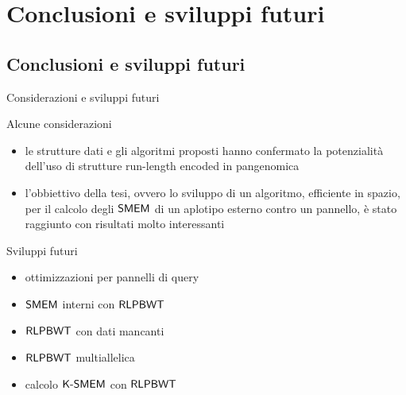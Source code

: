 \documentclass[]{beamer}
\def\KSMEM{\mbox{\rm {\sf K-SMEM}}}
\def\RLPBWT{\mbox{\rm {\sf RLPBWT}}}
\def\SMEM{\mbox{\rm {\sf SMEM}}}
\begin{document}
\section{Conclusioni e sviluppi futuri}
\subsection{Conclusioni e sviluppi futuri}
\begin{frame}{Considerazioni e sviluppi futuri}
  \begin{block}{Alcune considerazioni}
    \small
    \begin{itemize}
      \item le strutture dati e gli algoritmi proposti hanno
      confermato la potenzialità dell'uso di strutture run-length encoded in
      pangenomica
      \item l'obbiettivo della tesi, ovvero lo sviluppo di un algoritmo,
      efficiente in spazio, per il calcolo degli $\SMEM$ di un aplotipo esterno
      contro un pannello, è stato raggiunto con risultati molto interessanti
    \end{itemize}
  \end{block}
  \begin{block}{Sviluppi futuri}
    \small
    \begin{multicols}{2}
      \begin{itemize}
        \item ottimizzazioni per pannelli di query
        \item $\SMEM$ interni con $\RLPBWT$
        \item $\RLPBWT$ con dati mancanti
        \item $\RLPBWT$ multiallelica
        \item calcolo $\KSMEM$ con $\RLPBWT$
      \end{itemize}
    \end{multicols}
  \end{block}
\end{frame}
\end{document}
